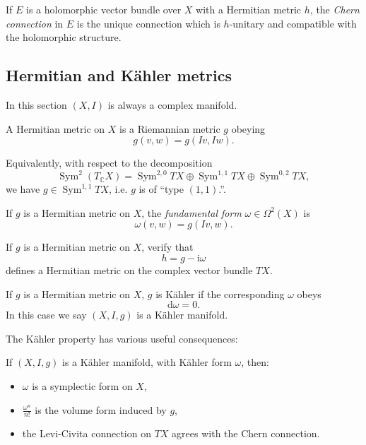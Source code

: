 \documentclass[12pt,letterpaper,reqno]{amsart}
\numberwithin{equation}{section}
\newcommand{\C}{\ensuremath{\mathbb C}}
\newcommand{\kahler}{K\"ahler\xspace}
\newcommand{\I}{{\mathrm i}}
\newcommand{\de}{\mathrm{d}}
\newcommand{\ti}[1]{\textit{#1}}
\DeclareMathOperator{\Sym}{Sym}
\begin{document}
\begin{defn}
If $E$ is a holomorphic vector bundle over $X$ with
a Hermitian metric $h$, the \ti{Chern connection} 
in $E$ is the unique connection which is 
$h$-unitary and compatible with the holomorphic
structure.
\end{defn}

\subsection{Hermitian and \kahler metrics}

In this section $(X,I)$ is always a complex manifold.

\begin{defn} A Hermitian metric on $X$ is a Riemannian
metric $g$ obeying
$$ g(v,w) = g(Iv,Iw). $$
\end{defn}
Equivalently, with respect to the decomposition 
\begin{equation}
  \Sym^2 (T_\C X) = \Sym^{2,0} TX \oplus \Sym^{1,1} TX \oplus \Sym^{0,2} TX,
\end{equation}
we have $g \in \Sym^{1,1} TX$, i.e. $g$ is of ``type $(1,1)$.''.

\begin{defn} If $g$ is a Hermitian metric on $X$, 
the \ti{fundamental form} $\omega \in \Omega^2(X)$
is
\begin{equation}
  \omega(v,w) = g(Iv,w).
\end{equation}
\end{defn}

\begin{exercise} If $g$ is a Hermitian metric on $X$,
verify that
\begin{equation}
  h = g - \I \omega
\end{equation}
defines a Hermitian metric on the complex vector
bundle $TX$.
\end{exercise}

\begin{defn} If $g$ is a Hermitian metric on $X$,
$g$ is \kahler if the corresponding $\omega$ obeys
\begin{equation}
  \de \omega = 0.
\end{equation}
In this case we say $(X,I,g)$ is a \kahler manifold.
\end{defn}

The \kahler property has various useful consequences:
\begin{prop}
If $(X,I,g)$ is a \kahler manifold, with
\kahler form $\omega$, then:
\begin{itemize}
  \item $\omega$ is a symplectic form on $X$,
  \item $\frac{\omega^n}{n!}$ is the volume form induced by $g$,
  \item the Levi-Civita connection on $TX$ agrees with the Chern connection.
\end{itemize}

\end{prop}
\end{document}

